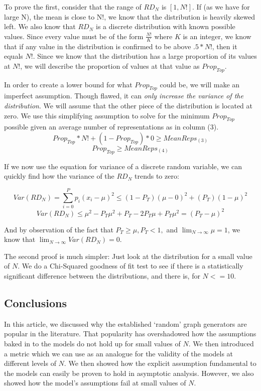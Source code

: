 \documentclass[a4paper,12pt]{article}
\begin{document}
To prove the first, consider that the range of \(RD_N\) is \([1, N!]\). 
If (as we have for large N), the mean is close to N!, we know that the distribution is heavily skewed left.
We also know that \(RD_N\) is a discrete distribution with known possible values.
Since every value must be of the form \(\frac{N!}{K}\) where \(K\) is an integer, we know that if any value in the distribution is confirmed to be above \(.5 * N!\), then it equals \(N!\). 
Since we know that the distribution has a large proportion of its values at \(N!\), we will describe the proportion of values at that value as \(Prop_{Top}\).

In order to create a lower bound for what \(Prop_{Top}\) could be, we will make an imperfect assumption. 
Though flawed, it can \emph{only increase the variance of the distribution}.
We will assume that the other piece of the distribution is located at zero. 
We use this simplifying assumption to solve for the minimum \(Prop_{Top}\) possible given an average number of representations as in column (3).
\[ Prop_{Top} * N! + (1 - Prop_{Top}) * 0 \geq MeanReps_{(3)}\] 
\[ Prop_{Top} \geq MeanReps_{(4)} \]

If we now use the equation for variance of a discrete random variable, we can quickly find how the variance of the \(RD_N\) trends to zero:

\[Var(RD_N) = \sum_{i=0}^P p_i (x_i - \mu)^2 \leq (1 - P_T) (\mu - 0)^2 + (P_T) (1 - \mu)^2\]
\[Var(RD_N) \leq \mu^2 - P_T \mu^2 + P_T - 2 P_T \mu + P_T \mu^2 = (P_T - \mu)^2\]

And by observation of the fact that \(P_T \geq \mu, P_T < 1,\) and \(\lim_{N \to \infty}\mu =  1\), we know that \(\lim_{N \to \infty} Var(RD_N) = 0\).

The second proof is much simpler: Just look at the distribution for a small value of \(N\).
We do a Chi-Squared goodness of fit test to see if there is a statistically significant difference between the distributions, and there is, for \(N <= 10\).

\subsection*{Conclusions}

In this article, we discussed why the established `random' graph generators are popular in the literature.
That popularity has overshadowed how the assumptions baked in to the models do not hold up for small values of \(N\).
We then introduced a metric which we can use as an analogue for the validity of the models at different levels of \(N\).
We then showed how the explicit assumption fundamental to the models can easily be proven to hold in asymptotic analysis.
However, we also showed how the model's assumptions fail at small values of \(N\).
\end{document}
